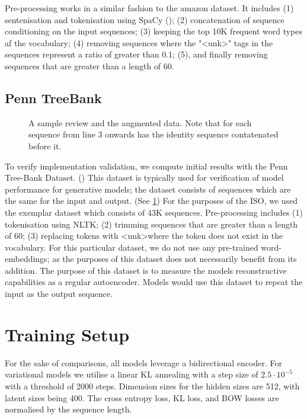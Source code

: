 \documentclass[12pt,twoside]{report}
\begin{document}
Pre-processing works in a similar fashion to the amazon dataset. It includes (1) sentenisation and tokenisation using SpaCy (\cite{honnibal_spacy_2017}); (2) concatenation of sequence conditioning on the input sequences; (3) keeping the top 10K frequent word types af the vocabulary; (4) removing sequences where the "\textless{}unk\textgreater" tags in the sequences represent a ratio of greater than 0.1; (5), and finally removing sequences that are greater than a length of 60. 

\subsection{Penn TreeBank}

\begin{figure}[!ht]
	\centering
	
	\caption{A sample review and the augmented data. Note that for each sequence from line 3 onwards has the identity sequence contatenated before it. \label{ex_dataset:ptb}}
	\end{figure}

To verify implementation validation, we compute initial results with the Penn Tree-Bank Dataset. (\cite{marcus_building_2002}) This dataset is typically used for verification of model performance for generative models; the dataset consists of sequences which are the same for the input and output. (See \ref{ex_dataset:ptb}) For the purposes of the ISO, we used the exemplar dataset which consists of 43K sequences. Pre-processing includes (1) tokenisation using NLTK; (2) trimming sequences that are greater than a length of 60; (3) replacing tokens with \textless{}unk\textgreater where the token does not exist in the vocabulary. For this particular dataset, we do not use any pre-trained word-embeddings; as the purposes of this dataset does not necessarily benefit from its addition. The purpose of this dataset is to measure the models reconstructive capabilities as a regular autoencoder. Models would use this dataset to repeat the input as the output sequence.

\section{Training Setup}

For the sake of comparisons, all models leverage a bidirectional encoder. For variational models we utilise a linear KL annealing with a step size of $2.5\cdot 10^{-5}$ with a threshold of 2000 steps. Dimension sizes for the hidden sizes are 512, with latent sizes being 400. The cross entropy loss, KL loss, and BOW losses are normalised by the sequence length. 
\end{document}
